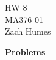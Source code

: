 \documentclass[11pt]{article}
\begin{document}
\begin{center}
 
  \LARGE{HW 8}\\
  \Large{MA376-01 \\ }
  \Large{Zach Humes}

\end{center}



{\bf Problems}
\end{document}
